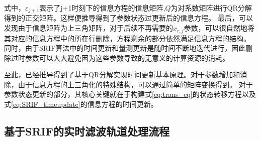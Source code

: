 式中，\(\varepsilon_{j+1}\)表示了j+1时刻下的信息方程的信息矩阵,\(Q\)为对系数矩阵进行QR分解得到的正交矩阵。这样便推导得到了参数状态过更新后的信息方程。
最后，可以发现由于信息矩阵为上三角矩阵，对于后续不再需要的\(x_{r,j}\)参数，可以很自然地将其对应的信息方程中的所在行删除，方程剩余的部分依然满足信息方程的结构。
同时，由于SRIF算法中的时间更新和量测更新是随时间不断地迭代进行，因此删除过时参数可以大大避免因为这些参数导致的无意义的计算资源的消耗。

至此，已经推导得到了基于QR分解实现时间更新基本原理。对于参数增加和消除，由于信息方程的上三角化的特殊结构，可以通过简单的矩阵变换得到。
对于参数状态更新的部分，其核心关键就在于构建式\eqref{eq:trans_eq}的状态转移方程以及式\eqref{eq:SRIF_timeupdate}的信息方程的时间更新。

\subsection{基于SRIF的实时滤波轨道处理流程}

